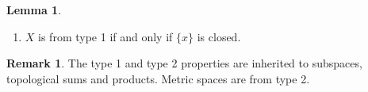 \documentclass[a4paper]{book}
\theoremstyle{definition}
\newtheorem{lemma}[definition]{Lemma}
\newtheorem*{remark}{Remark}
\begin{document}
    \begin{lemma}
        \begin{enumerate}
            \item \(X\) is from type 1 if and only if \(\{x\}\) is closed.
        \end{enumerate}
    \end{lemma}
    \begin{remark}
        The type 1 and type 2 properties are inherited to subspaces, topological sums and products.
        Metric spaces are from type 2.
    \end{remark}
\end{document}
